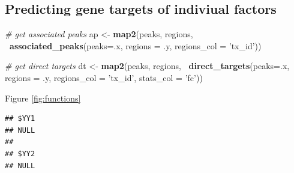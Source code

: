 \documentclass[9pt,a4paper,]{extarticle}
\newenvironment{Shaded}{\begin{snugshade}}{\end{snugshade}}
\newcommand{\CommentTok}[1]{\textcolor[rgb]{0.56,0.35,0.01}{\textit{#1}}}
\newcommand{\DataTypeTok}[1]{\textcolor[rgb]{0.13,0.29,0.53}{#1}}
\newcommand{\DecValTok}[1]{\textcolor[rgb]{0.00,0.00,0.81}{#1}}
\newcommand{\KeywordTok}[1]{\textcolor[rgb]{0.13,0.29,0.53}{\textbf{#1}}}
\newcommand{\NormalTok}[1]{#1}
\newcommand{\OperatorTok}[1]{\textcolor[rgb]{0.81,0.36,0.00}{\textbf{#1}}}
\newcommand{\StringTok}[1]{\textcolor[rgb]{0.31,0.60,0.02}{#1}}
\begin{document}
\hypertarget{predicting-gene-targets-of-indiviual-factors}{%
\subsection{Predicting gene targets of indiviual factors}\label{predicting-gene-targets-of-indiviual-factors}}

\begin{Shaded}
\begin{Highlighting}[]
\CommentTok{# get associated peaks}
\NormalTok{ap <-}\StringTok{ }\KeywordTok{map2}\NormalTok{(peaks, regions,}
           \OperatorTok{~}\KeywordTok{associated_peaks}\NormalTok{(}\DataTypeTok{peaks=}\NormalTok{.x,}
                             \DataTypeTok{regions =}\NormalTok{ .y,}
                             \DataTypeTok{regions_col =} \StringTok{'tx_id'}\NormalTok{))}

\CommentTok{# get direct targets}
\NormalTok{dt <-}\StringTok{ }\KeywordTok{map2}\NormalTok{(peaks, regions,}
           \OperatorTok{~}\KeywordTok{direct_targets}\NormalTok{(}\DataTypeTok{peaks=}\NormalTok{.x,}
                           \DataTypeTok{regions =}\NormalTok{ .y,}
                           \DataTypeTok{regions_col =} \StringTok{'tx_id'}\NormalTok{,}
                           \DataTypeTok{stats_col =} \StringTok{'fc'}\NormalTok{))}
\end{Highlighting}
\end{Shaded}

Figure \ref{fig:functions}

\begin{Shaded}
\end{Shaded}

\begin{verbatim}
## $YY1
## NULL
## 
## $YY2
## NULL
\end{verbatim}
\end{document}
